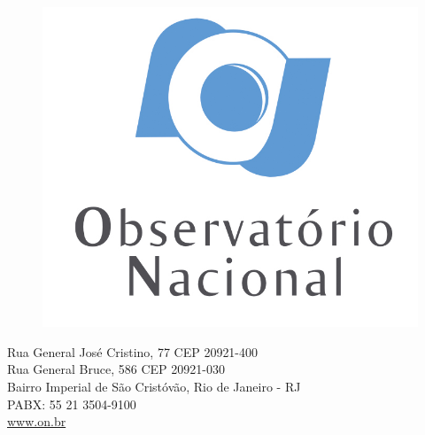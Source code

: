 \documentclass[aspectratio=10]{beamer} %
\begin{document}
\makeatother
{
\begin{frame}
	\begin{figure}
		\includegraphics[scale=0.25]{Imagens/logonvertical.jpg}
	\end{figure}
	\begin{center}
		\begin{minipage}{0.77\textwidth}
			\small
			\begin{center}
				Rua General José Cristino, 77 CEP 20921-400\\
				Rua General Bruce, 586 CEP 20921-030\\
				Bairro Imperial de São Cristóvão, Rio de Janeiro - RJ\\
				PABX: 55 21 3504-9100\\
				\url{www.on.br}
			\end{center}
		\end{minipage}
	\end{center}
\end{frame}
}
\end{document}
